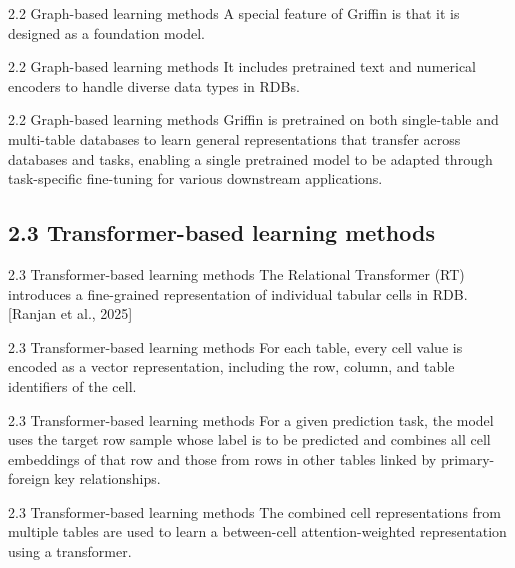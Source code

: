 \documentclass[aspectratio=169,10pt]{beamer}
\newcommand{\cit}[1]{{\scriptsize\color{gray}[#1]}}
\begin{document}
\begin{frame}{2.2 Graph-based learning methods}
A special feature of Griffin is that it is designed as a foundation model.
\end{frame}

\begin{frame}{2.2 Graph-based learning methods}
It includes pretrained text and numerical encoders to handle diverse data types in RDBs.
\end{frame}

\begin{frame}{2.2 Graph-based learning methods}
Griffin is pretrained on both single-table and multi-table databases to learn general representations that transfer across databases and tasks, enabling a single pretrained model to be adapted through task-specific fine-tuning for various downstream applications.
\end{frame}

\subsection{2.3 Transformer-based learning methods}

\begin{frame}{2.3 Transformer-based learning methods}
The Relational Transformer (RT) introduces a fine-grained representation of individual tabular cells in RDB.
\cit{Ranjan et al., 2025}
\end{frame}

\begin{frame}{2.3 Transformer-based learning methods}
For each table, every cell value is encoded as a vector representation, including the row, column, and table identifiers of the cell.
\end{frame}

\begin{frame}{2.3 Transformer-based learning methods}
For a given prediction task, the model uses the target row sample whose label is to be predicted and combines all cell embeddings of that row and those from rows in other tables linked by primary-foreign key relationships.
\end{frame}

\begin{frame}{2.3 Transformer-based learning methods}
The combined cell representations from multiple tables are used to learn a between-cell attention-weighted representation using a transformer.
\end{frame}
\end{document}

